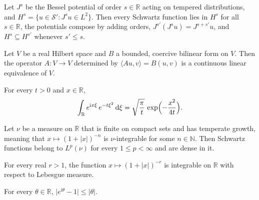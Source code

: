\begin{theorem}\label{thm:std_bessel_sobolev}
\mathlibok
Let $J^s$ be the Bessel potential of order $s \in \mathbb{R}$ acting on tempered distributions, and $H^s = \{u \in \mathcal{S}' : J^s u \in L^2\}$. Then every Schwartz function lies in $H^s$ for all $s \in \mathbb{R}$, the potentials compose by adding orders, $J^{s'} (J^s u) = J^{s + s'} u$, and $H^s \subseteq H^{s'}$ whenever $s' \le s$.
\end{theorem}

\begin{theorem}\label{thm:std_lax_milgram}
\mathlibok
Let $V$ be a real Hilbert space and $B$ a bounded, coercive bilinear form on $V$. Then the operator $A : V \to V$ determined by $\langle A u, v \rangle = B(u, v)$ is a continuous linear equivalence of $V$.
\end{theorem}

\begin{theorem}\label{thm:std_gaussian_fourier}
\mathlibok
For every $t > 0$ and $x \in \mathbb{R}$,
\[
  \int_{\mathbb{R}} e^{\mathrm{i} x \xi}\, e^{-t \xi^2}\, \mathrm{d}\xi = \sqrt{\frac{\pi}{t}}\, \exp\Bigl(-\frac{x^2}{4t}\Bigr).
\]
\end{theorem}

\begin{theorem}\label{thm:std_schwartz_dense_Lp}
\mathlibok
Let $\nu$ be a measure on $\mathbb{R}$ that is finite on compact sets and has temperate growth, meaning that $x \mapsto (1 + \lvert x \rvert)^{-n}$ is $\nu$-integrable for some $n \in \mathbb{N}$. Then Schwartz functions belong to $L^p(\nu)$ for every $1 \le p < \infty$ and are dense in it.
\end{theorem}

\begin{theorem}\label{thm:std_japanese_bracket}
\mathlibok
For every real $r > 1$, the function $x \mapsto (1 + \lvert x \rvert)^{-r}$ is integrable on $\mathbb{R}$ with respect to Lebesgue measure.
\end{theorem}

\begin{theorem}\label{thm:std_exp_chord}
\mathlibok
For every $\theta \in \mathbb{R}$, $\lvert e^{\mathrm{i}\theta} - 1 \rvert \le \lvert \theta \rvert$.
\end{theorem}

